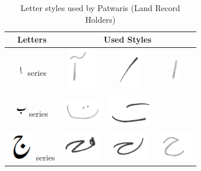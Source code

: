 \documentclass[a4paper,conference]{IEEEtran}
\begin{document}
\begin{table}[h]
\centering
\caption{Letter styles used by Patwaris (Land Record Holders)}\label{tab6-lro}
\begin{tabular}{@{}cccc@{}}
\hline
Letters	& \multicolumn{3}{c}{\textbf{Used Styles}} \\ \hline
\includegraphics[scale=0.50]{alif.png} series & \includegraphics[scale=0.25]{81} & \includegraphics[scale=0.25]{82}  & \includegraphics[scale=0.45]{83}  \\ 
\hline
\includegraphics[scale=0.50]{bay} series & \includegraphics[scale=0.20]{84} & \includegraphics[scale=0.20]{85}  &  \\
\hline
\includegraphics[scale=0.25]{jeeem} series & \includegraphics[scale=0.25]{86} & \includegraphics[scale=0.20]{87}  & \includegraphics[scale=0.15]{88} \\

\end{tabular}
\end{table}
\end{document}
